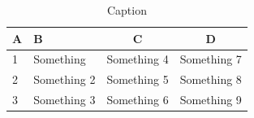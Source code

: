 \begin{table}[H]
	\centering
	\begin{tabularx}{\textwidth}{l X c c} 
		\toprule
		\textbf{A} & \textbf{B} & \textbf{C} & \textbf{D} \\
		\midrule
		1  & Something   & Something 4 & Something 7 \\
		2  & Something 2 & Something 5 & Something 8 \\
		3  & Something 3 & Something 6 & Something 9 \\
		\bottomrule
	\end{tabularx}
	\caption{Caption}
	\label{tab:table}
\end{table}
